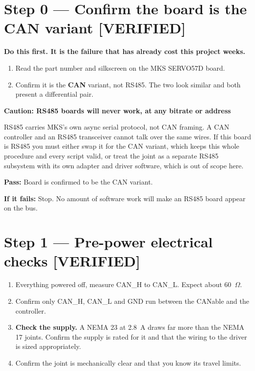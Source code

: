 \documentclass[11pt,letterpaper]{article}
\newenvironment{caution}[1]{%
    \par\addvspace{8pt}%
    \noindent{\color{cautionred}\rule{\linewidth}{0.8pt}}\par\vspace{2pt}
    \noindent\textbf{\color{cautionred}Caution: #1}\par\vspace{2pt}
}{%
    \par\vspace{2pt}\noindent{\color{cautionred}\rule{\linewidth}{0.4pt}}%
    \par\addvspace{8pt}%
}
\newcommand{\verified}{{\color{okgreen}\textbf{[VERIFIED]}}}
\newcommand{\passif}[1]{\par\vspace{2pt}\noindent\textbf{\color{okgreen}Pass:} #1\par\vspace{4pt}}
\newcommand{\failif}[1]{\noindent\textbf{If it fails:} #1\par\vspace{6pt}}
\begin{document}
\section*{Step 0 --- Confirm the board is the CAN variant \verified}

\textbf{Do this first. It is the failure that has already cost this project weeks.}

\begin{enumerate}[leftmargin=*]
    \item Read the part number and silkscreen on the MKS SERVO57D board.
    \item Confirm it is the \textbf{CAN} variant, not RS485. The two look similar and
          both present a differential pair.
\end{enumerate}

\begin{caution}{RS485 boards will never work, at any bitrate or address}
RS485 carries MKS's own async serial protocol, not CAN framing. A CAN controller and
an RS485 transceiver cannot talk over the same wires. If this board is RS485 you must
either swap it for the CAN variant, which keeps this whole procedure and every script
valid, or treat the joint as a separate RS485 subsystem with its own adapter and
driver software, which is out of scope here.
\end{caution}

\passif{Board is confirmed to be the CAN variant.}
\failif{Stop. No amount of software work will make an RS485 board appear on the bus.}

\section*{Step 1 --- Pre-power electrical checks \verified}

\begin{enumerate}[leftmargin=*]
    \item Everything powered off, measure CAN\_H to CAN\_L. Expect about 60~$\Omega$.
    \item Confirm only CAN\_H, CAN\_L and GND run between the CANable and the
          controller.
    \item \textbf{Check the supply.} A NEMA 23 at 2.8~A draws far more than the NEMA
          17 joints. Confirm the supply is rated for it and that the wiring to the
          driver is sized appropriately.
    \item Confirm the joint is mechanically clear and that you know its travel limits.
\end{enumerate}
\end{document}
